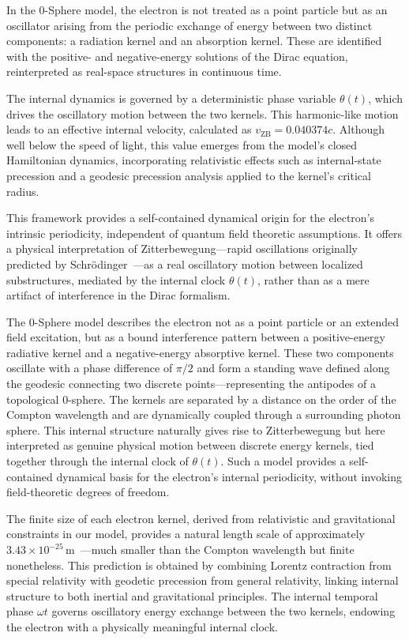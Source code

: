 \documentclass[%
 reprint,
 amsmath,amssymb,
 aps,
]{revtex4-1}
\numberwithin{equation}{section}%
\begin{document}
In the 0-Sphere model, the electron is not treated as a point particle but as an oscillator arising from the periodic exchange of energy between two distinct components: a radiation kernel and an absorption kernel. These are identified with the positive- and negative-energy solutions of the Dirac equation, reinterpreted as real-space structures in continuous time.

The internal dynamics is governed by a deterministic phase variable $\theta(t)$, which drives the oscillatory motion between the two kernels. This harmonic-like motion leads to an effective internal velocity, calculated as $v_{\mathrm{ZB}} = 0.040374c$. Although well below the speed of light, this value emerges from the model’s closed Hamiltonian dynamics, incorporating relativistic effects such as internal-state precession and a geodesic precession analysis applied to the kernel’s critical radius.

This framework provides a self-contained dynamical origin for the electron’s intrinsic periodicity, independent of quantum field theoretic assumptions. It offers a physical interpretation of Zitterbewegung---rapid oscillations originally predicted by Schrödinger~\cite{zitterbewegung_schrodinger1930}---as a real oscillatory motion between localized substructures, mediated by the internal clock $\theta(t)$, rather than as a mere artifact of interference in the Dirac formalism.

The 0-Sphere model describes the electron not as a point particle or an extended field excitation, but as a bound interference pattern between a positive-energy radiative kernel and a negative-energy absorptive kernel. These two components oscillate with a phase difference of $\pi / 2$ and form a standing wave defined along the geodesic connecting two discrete points—representing the antipodes of a topological 0-sphere. The kernels are separated by a distance on the order of the Compton wavelength and are dynamically coupled through a surrounding photon sphere. This internal structure naturally gives rise to Zitterbewegung but here interpreted as genuine physical motion between discrete energy kernels, tied together through the internal clock of $\theta (t)$. Such a model provides a self-contained dynamical basis for the electron's internal periodicity, without invoking field-theoretic degrees of freedom.

The finite size of each electron kernel, derived from relativistic and gravitational constraints in our model, provides a natural length scale of approximately \(3.43 \times 10^{-25} \, \text{m}\)~\cite{hanamura2024quantum}---much smaller than the Compton wavelength but finite nonetheless. This prediction is obtained by combining Lorentz contraction from special relativity with geodetic precession from general relativity, linking internal structure to both inertial and gravitational principles. The internal temporal phase $\omega t$ governs oscillatory energy exchange between the two kernels, endowing the electron with a physically meaningful internal clock.
\end{document}
